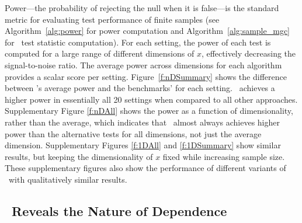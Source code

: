 \documentclass[11pt]{article}
\begin{document}
Power---the probability of rejecting the null when it is  false---is the standard metric for evaluating test performance of finite samples (see Algorithm~\ref{alg:power} for power computation and Algorithm~\ref{alg:sample_mgc} for \Mgc~test statistic computation).  
For each setting, the power of each test is computed for a large range of different dimensions of $x$,  effectively decreasing the signal-to-noise ratio.  
The average power across dimensions for each algorithm provides a scalar score per setting. Figure~\ref{f:nDSummary} shows the difference between \Mgc's average power and the benchmarks' for each setting.  
\Mgc~achieves a higher power in essentially all 20 settings when compared to all other approaches.  
Supplementary Figure \ref{f:nDAll} shows the power as a function of dimensionality, rather than the average, which indicates that  \Mgc~almost always achieves higher power than the alternative tests for all dimensions, not just the average dimension.  
 Supplementary Figures \ref{f:1DAll} and \ref{f:1DSummary} show similar results,  but keeping the dimensionality of $x$ fixed while increasing sample size. These supplementary figures also show the performance of different variants of \Mgc~with qualitatively similar results.



\subsection*{\Mgc~Reveals the Nature of Dependence}
\label{main3}
\end{document}
